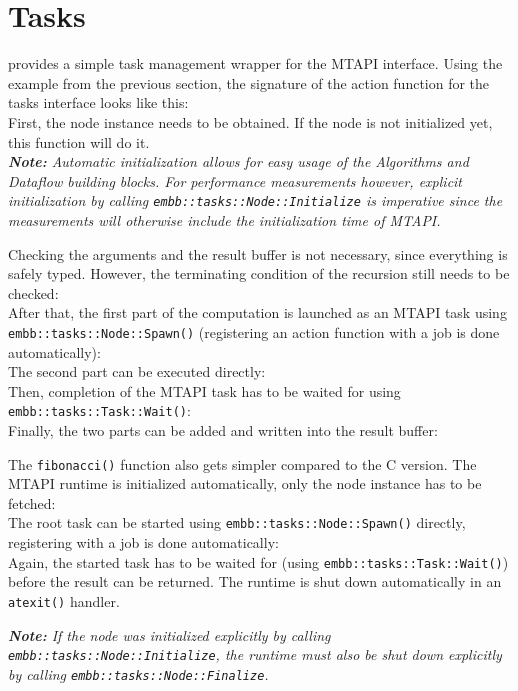 \chapter{Tasks}
\label{cha:tasks}

\embb provides a simple task management wrapper for the MTAPI interface. Using the example from the previous section, the signature of the action function for the tasks interface looks like this:
%
\\
%
First, the node instance needs to be obtained. If the node is not initialized yet, this function will do it.
%
\\
%
\emph{\textbf{Note:} Automatic initialization allows for easy usage of the \emph{Algorithms} and \emph{Dataflow} building blocks. For performance measurements however, explicit initialization by calling \lstinline|embb::tasks::Node::Initialize| is imperative since the measurements will otherwise include the initialization time of MTAPI.}

Checking the arguments and the result buffer is not necessary, since everything is safely typed. However, the terminating condition of the recursion still needs to be checked:
%
\\
%
After that, the first part of the computation is launched as an MTAPI task using \lstinline|embb::tasks::Node::Spawn()| (registering an action function with a job is done automatically):
%
\\
%
The second part can be executed directly:
%
\\
%
Then, completion of the MTAPI task has to be waited for using \lstinline|embb::tasks::Task::Wait()|:
%
\\
%
Finally, the two parts can be added and written into the result buffer:
%
\\
% 

The \lstinline|fibonacci()| function also gets simpler compared to the C version. The MTAPI runtime is initialized automatically, only the node instance has to be fetched:
%
\\
%
The root task can be started using \lstinline|embb::tasks::Node::Spawn()| directly, registering with a job is done automatically:
%
\\
%
Again, the started task has to be waited for (using \lstinline|embb::tasks::Task::Wait()|) before the result can be returned. The runtime is shut down automatically in an \lstinline|atexit()| handler.

\emph{\textbf{Note:} If the node was initialized explicitly by calling \lstinline|embb::tasks::Node::Initialize|, the runtime must also be shut down explicitly by calling \lstinline|embb::tasks::Node::Finalize|.}
